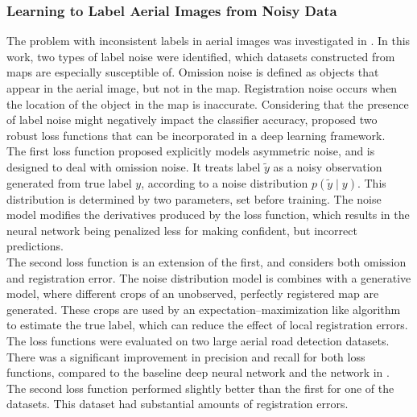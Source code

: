 
\subsubsection{Learning to Label Aerial Images from Noisy Data}
The problem with inconsistent labels in aerial images was investigated in \citep{Mnih_aerial_images_noisy}. In this work, two types of label noise were identified,  which datasets constructed from maps are especially susceptible of. Omission noise is defined as objects that appear in the aerial image, but not in the map. Registration noise occurs when the location of the object in the map is inaccurate. Considering that the presence of label noise might negatively impact the classifier accuracy, \cite{Mnih_aerial_images_noisy} proposed two robust loss functions that can be incorporated in a deep learning framework. \\

The first loss function proposed explicitly models asymmetric noise, and is designed to deal with omission noise. It treats label $\tilde{y}$ as a noisy observation generated from true label $y$, according to a noise distribution $p(\tilde{y} \mid y)$. This distribution is determined by two parameters, set before training. The noise model modifies the derivatives produced by the loss function, which results in the neural network being penalized less for making confident, but incorrect predictions. \\

The second loss function is an extension of the first, and considers both omission and registration error. The noise distribution model is combines with a generative model, where different crops of an unobserved, perfectly registered map are generated. These crops are used by an expectation–maximization like algorithm to estimate the true label, which can reduce the effect of local registration errors.\\


The loss functions were evaluated on two large aerial road detection datasets. There was a significant improvement in precision and recall for both loss functions, compared to the baseline deep neural network and the network in \citep{Mnih_roads_high_res_aerial_images}. The second loss function performed slightly better than the first for one of the datasets. This dataset had substantial amounts of registration errors.\\


